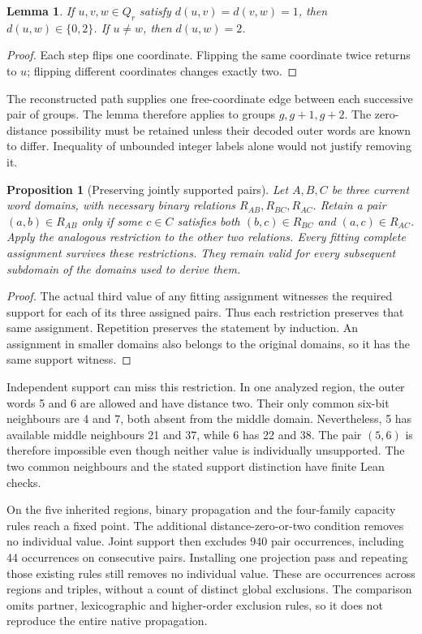 \documentclass[11pt,a4paper]{article}
\newtheorem{proposition}[theorem]{Proposition}
\newtheorem{lemma}[theorem]{Lemma}
\theoremstyle{definition}
\theoremstyle{remark}
\begin{document}
\begin{lemma}\label{lem:two-step216}
If $u,v,w\in Q_r$ satisfy $d(u,v)=d(v,w)=1$, then
$d(u,w)\in\{0,2\}$. If $u\ne w$, then $d(u,w)=2$.
\end{lemma}
\begin{proof}
Each step flips one coordinate. Flipping the same coordinate twice
returns to $u$; flipping different coordinates changes exactly two.
\end{proof}

The reconstructed path supplies one free-coordinate edge between each
successive pair of groups. The lemma therefore applies to groups
$g,g+1,g+2$. The zero-distance possibility must be retained unless
their decoded outer words are known to differ. Inequality of unbounded
integer labels alone would not justify removing it.

\begin{proposition}[Preserving jointly supported pairs]\label{prop:joint216}
Let $A,B,C$ be three current word domains, with necessary binary
relations $R_{AB},R_{BC},R_{AC}$. Retain a pair $(a,b)\in R_{AB}$
only if some $c\in C$ satisfies both $(b,c)\in R_{BC}$ and
$(a,c)\in R_{AC}$. Apply the analogous restriction to the other
two relations. Every fitting complete assignment survives these
restrictions. They remain valid for every subsequent subdomain of
the domains used to derive them.
\end{proposition}
\begin{proof}
The actual third value of any fitting assignment witnesses the
required support for each of its three assigned pairs. Thus each
restriction preserves that same assignment. Repetition preserves
the statement by induction. An assignment in smaller domains also
belongs to the original domains, so it has the same support witness.
\end{proof}

Independent support can miss this restriction. In one analyzed region,
the outer words 5 and 6 are allowed and have distance two. Their only
common six-bit neighbours are 4 and 7, both absent from the middle
domain. Nevertheless, 5 has available middle neighbours 21 and 37,
while 6 has 22 and 38. The pair $(5,6)$ is therefore impossible even
though neither value is individually unsupported. The two common
neighbours and the stated support distinction have finite Lean checks.

On the five inherited regions, binary propagation and the four-family
capacity rules reach a fixed point. The additional distance-zero-or-two
condition removes no individual value. Joint support then excludes
940 pair occurrences, including 44 occurrences on consecutive pairs.
Installing one projection pass and repeating those existing rules
still removes no individual value. These are occurrences across
regions and triples, without a count of distinct global exclusions.
The comparison omits partner, lexicographic and higher-order exclusion
rules, so it does not reproduce the entire native propagation.
\end{document}
